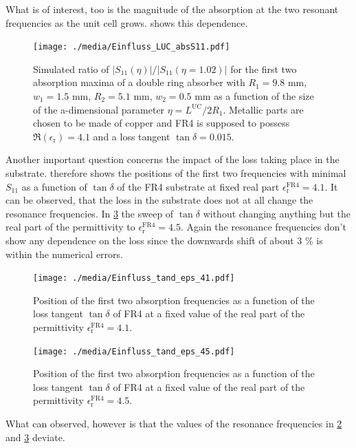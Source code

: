 What is of interest, too is the magnitude of the absorption at the two resonant frequencies as the unit cell grows.  shows this dependence.

\begin{figure}
\centering
\texttt{[image: ./media/Einfluss\_LUC\_absS11.pdf]}
\caption{Simulated ratio of $|S_{11}(\eta)|/|S_{11}(\eta=1.02)|$ for the first two absorption maxima of a double ring absorber with $R_1=9.8$ mm, $w_1=1.5$ mm, $R_2=5.1$ mm, $w_2=0.5$ mm as a function of the size of the a-dimensional parameter $\eta = L^\mathrm{UC}/2R_1$. Metallic parts are chosen to be made of copper and FR4 is supposed to possess $\Re\left(\epsilon_\mathrm{r}\right)=4.1$ and a loss tangent $\tan\delta = 0.015$.}
\label{fig:LUC_absS11}
\end{figure}


Another important question concerns the impact of the loss taking place in the substrate.  therefore shows the positions of the first two frequencies with minimal $S_{11}$ as a function of $\tan\delta$ of the FR4 substrate at fixed real part $\epsilon_\mathrm{r}^\text{FR4}=4.1$.
It can be observed, that the loss in the substrate does not at all change the resonance frequencies.
In \cref{fig:tand_fi_45} the sweep of $\tan\delta$ without changing anything but the real part of the permittivity to $\epsilon_\mathrm{r}^\text{FR4}=4.5$. Again the resonance frequencies don't show any dependence on the loss since the downwards shift of about 3 \% is within the numerical errors.

\begin{figure}
\centering
\texttt{[image: ./media/Einfluss\_tand\_eps\_41.pdf]}
\caption{Position of the first two absorption frequencies as a function of the loss tangent $\tan\delta$ of FR4 at a fixed value of the real part of the permittivity $\epsilon_\mathrm{r}^\text{FR4}=4.1$.}
\label{fig:tand_fi_41}
\end{figure}
\begin{figure}
\centering
\texttt{[image: ./media/Einfluss\_tand\_eps\_45.pdf]}
\caption{Position of the first two absorption frequencies as a function of the loss tangent $\tan\delta$ of FR4 at a fixed value of the real part of the permittivity $\epsilon_\mathrm{r}^\text{FR4}=4.5$.}
\label{fig:tand_fi_45}
\end{figure}

What can observed, however is that the values of the resonance frequencies in \cref{fig:tand_fi_41} and \cref{fig:tand_fi_45} deviate. 

